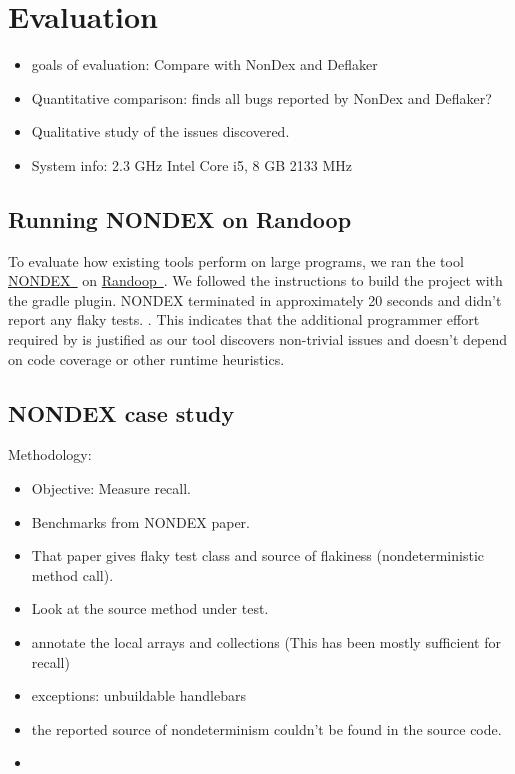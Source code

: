 \section{Evaluation}
\begin{itemize}
    \item goals of evaluation: Compare with NonDex and Deflaker
    \item Quantitative comparison: \theDeterminismChecker finds all bugs reported by NonDex and Deflaker?
    \item Qualitative study of the issues discovered.
    \item System info: 2.3 GHz Intel Core i5, 8 GB 2133 MHz
\end{itemize}

\subsection{Running NONDEX on Randoop}
To evaluate how existing tools perform on large programs, we ran the tool \href{https://github.com/TestingResearchIllinois/NonDex}{NONDEX~\cite{nondex}} on 
\href{https://github.com/randoop/randoop}{Randoop~\cite{randoop}}.
We followed the instructions to build the project with the gradle plugin. 
NONDEX terminated in approximately 20 seconds and didn't report any flaky tests.
.
This indicates that the additional programmer effort required by \theDeterminismChecker is justified
as our tool discovers non-trivial issues and doesn't depend on code coverage or other runtime heuristics.

\subsection{NONDEX case study}
Methodology:
\begin{itemize}
    \item Objective: Measure recall.
    \item Benchmarks from NONDEX paper.
    \item That paper gives flaky test class and source of flakiness (nondeterministic method call).
    \item Look at the source method under test.
    \item annotate the local arrays and collections (This has been mostly sufficient for recall)
    \item exceptions: unbuildable handlebars
    \item the reported source of nondeterminism couldn't be found in the source code.
    \item {}
\end{itemize}

